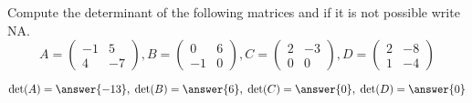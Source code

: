 \documentclass{ximera}
\author{Parisa Fatheddin}
\begin{document}
\begin{exercise}


Compute the determinant of the following matrices and if it is not possible write NA.
\[A=
\begin{pmatrix}
-1 & 5\\
4 & -7
\end{pmatrix}, B = \begin{pmatrix} 0 & 6\\
-1 & 0
\end{pmatrix}, C= \begin{pmatrix} 2 & -3 \\
0 & 0
\end{pmatrix}, D = \begin{pmatrix} 2 & -8 \\
1 & -4
\end{pmatrix}\]

\begin{prompt}
\[\text{det}(A) = \answer{-13}, \hspace{.1cm} \text{det}(B)= \answer{6}, \hspace{.1cm} \text{det}(C) = \answer{0}, \hspace{.1cm} \text{det}(D) = \answer{0}
\]
\end{prompt}























\end{exercise}
\end{document}
